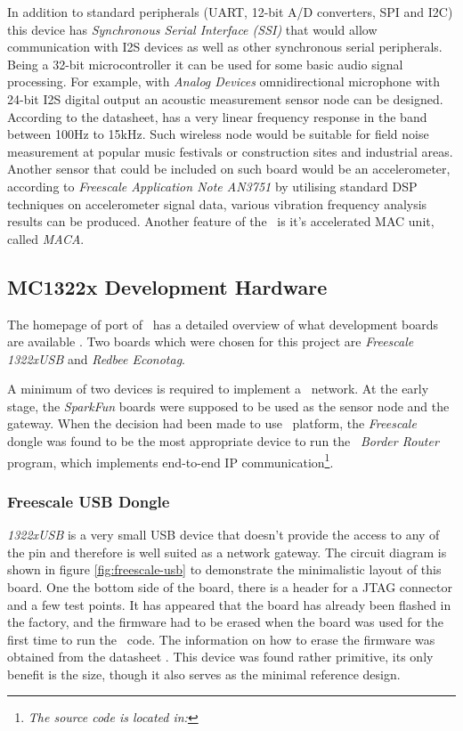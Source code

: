   In addition to standard peripherals (UART, 12-bit A/D converters,
 SPI and I2C) this device has \emph{Synchronous Serial Interface (SSI)}
 that would allow communication with I2S devices as well as other
 synchronous serial peripherals. Being a 32-bit microcontroller
 it can be used for some basic audio signal processing. For example,
 with \emph{Analog Devices}  omnidirectional microphone
 with 24-bit I2S digital output \cite{datasheet:adi:admp441} an
 acoustic measurement sensor node can be designed. According to the
 datasheet,  has a very linear frequency response in
 the band between 100Hz to 15kHz. Such wireless node would be
 suitable for field noise measurement at popular music festivals
 or construction sites and industrial areas.
 Another sensor that could be included on such board would be an
 accelerometer, according to \emph{Freescale Application
 Note AN3751} \cite{appnote:freescale:AN3751} by utilising standard
 DSP techniques on accelerometer signal data, various vibration
 frequency analysis results can be produced. Another feature of
 the \MCX\ is it's accelerated MAC unit, called \emph{MACA}.

\subsection{MC1322x Development Hardware}

  The homepage of  port of \Contiki\ has a detailed
 overview of what development boards are available
 \cite{links:contiki:rcb:mc1322x}.
 Two boards which were chosen for this project are \emph{Freescale
 1322xUSB} and \emph{Redbee Econotag}.

  A minimum of two devices is required to implement a \WPAN\ network.
 At the early stage, the \emph{SparkFun} boards were supposed to be
 used as the sensor node and the gateway. When the decision had been
 made to use \MCX\ platform, the \emph{Freescale} dongle was found to
 be the most appropriate device to run the \Contiki\ \emph{Border Router}
 program, which implements end-to-end IP communication\footnote{\emph{The
 source code is located in: }}.

\subsubsection{Freescale USB Dongle}

 \emph{1322xUSB} is a very small USB device that doesn't provide the
 access to any of the pin and therefore is well suited as a network
 gateway. The circuit diagram is shown in figure \ref{fig:freescale-usb}
 to demonstrate the minimalistic layout of this board. One the bottom
 side of the board, there is a header for a JTAG connector and a few
 test points. It has appeared that the board has already been flashed
 in the factory, and the firmware had to be erased when the board was
 used for the first time to run the \Contiki\ code. The information on
 how to erase the firmware was obtained from the datasheet
 \cite{links:freescale:1322xusb}. This device was found rather primitive,
 its only benefit is the size, though it also serves as the minimal reference design.

